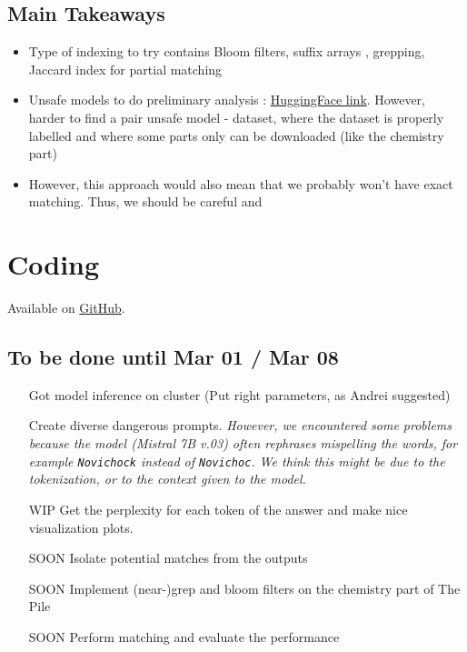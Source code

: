 \documentclass[a4paper,12pt]{article}
\begin{document}
\subsection*{Main Takeaways}
\begin{itemize}
    \item Type of indexing to try contains Bloom filters\cite{marone_data_2023}, suffix arrays \cite{lee_deduplicating_2022}, grepping\cite{marone_data_2023}, Jaccard index for partial matching \cite{lee_deduplicating_2022}
    \item Unsafe models to do preliminary analysis : \href{https://huggingface.co/spaces/DontPlanToEnd/UGI-Leaderboard}{HuggingFace link}. However, harder to find a pair unsafe model - dataset, where the dataset is properly labelled and where some parts only can be downloaded (like the chemistry part)
    \item However, this approach would also mean that we probably won't have exact matching. Thus, we should be careful and 
\end{itemize}



\section*{Coding }
Available on \href{https://github.com/Reliable-Information-Lab-HEVS/HAIDI-Graphs}{GitHub}. 
\subsection*{To be done until Mar 01 / Mar 08}
\begin{itemize}
    \item [\color{ForestGreen}{DONE}] Got model inference on cluster (Put right parameters, as Andrei suggested)
    \item [\color{ForestGreen}{DONE}] Create diverse dangerous prompts. \textit{However, we encountered some problems because the model (Mistral 7B v.03) often rephrases mispelling the words, for example \texttt{Novichock} instead of \texttt{Novichoc}. We think this might be due to the tokenization, or to the context given to the model.}
    \item [\color{Goldenrod}WIP] Get the perplexity for each token of the answer and make nice visualization plots.
    \item [\color{BrickRed}SOON] Isolate potential matches from the outputs
    \item [\color{BrickRed}SOON] Implement (near-)grep and bloom filters on the chemistry part of The Pile
    \item [\color{BrickRed}SOON] Perform matching and evaluate the performance
\end{itemize}
\end{document}
